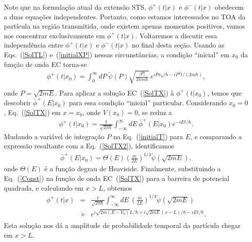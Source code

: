 Note que na formulação atual da extensão STS, $\phi^+(t|x)$ e $\phi^-(t|x)$ obedecem a duas equações independentes. Portanto, como estamos interessados no TOA da partícula na região transmitida, onde existem apenas momentos positivos, vamos nos concentrar exclusivamente em $\phi^+(t|x)$. Voltaremos a discutir essa independência entre $\phi^+(t|x)$ e $\phi^-(t|x)$ no final desta seção. Usando as Eqs.~(\ref{SolTL}) e~(\ref{initialXP}) nessas circunstâncias, a condição ``inicial'' em $x_0$ da função de onda EC torna-se
\begin{eqnarray} \label{initialT}
\phi^+(t|x_0)= 
\int_0^{\infty}dP~{\tilde \psi}(P)\sqrt{\frac{|P|}{2\pi
m\hbar}}~e^{iPx_0/\hbar-iP^2t/(2m\hbar)},\nonumber\\
\end{eqnarray}
onde $P=\sqrt{2mE}$. Para aplicar a solução EC~(\ref{SolTX}) à $\phi^+(t|x_0)$, temos que descobrir ${{\bar \phi}^+}(E|x_0)$ para essa condição ``inicial'' particular. Considerando $x_0=0$, Eq.~(\ref{SolTX}) em $x=x_0$, onde $V(x_0)=0$, se reduz a
\begin{eqnarray}\label{SolTX2}
\phi^+(t|x_0)=\frac{1}{\sqrt{2\pi \hbar}}
\int_{-\infty}^{\infty}dE~{\bar \phi}^+(E|x_0)e^{-iEt/{\hbar}}.
\end{eqnarray}
Mudando a variável de integração $P$ na Eq.~(\ref{initialT}) para $E$, e comparando a expressão resultante com a Eq.~(\ref{SolTX2}), identificamos
\begin{eqnarray}\label{Const}
{\bar \phi}^+(E|x_0)=\Theta(E)\left(\frac{m}{2E}\right)^{1/4} {\tilde \psi}(\sqrt{2mE}),
\end{eqnarray}
onde $\Theta(E)$ é a função degrau de Heaviside. Finalmente, substituindo a Eq.~(\ref{Const}) na função de onda EC~(\ref{SolTX}) para a barreira de potencial quadrada, e calculando em $x>L$, obtemos
\begin{eqnarray}\label{SolTBarrier}
\phi^+(t|x)&=&\frac{1}{\sqrt{2\pi \hbar}}
\int_{-\infty}^{\infty}dE  ~\left(\frac{m}{2E}\right)^{1/4} {\tilde \psi}(\sqrt{2mE})\nonumber\\ &\times& e^{i\sqrt{ 2m \left( E - V_0 \right)} L/\hbar + i\sqrt{ 2m E} (x-L)/\hbar -iEt/\hbar}.\nonumber\\
\end{eqnarray}
Esta solução nos dá a amplitude de probabilidade temporal da partícula chegar em $x > L$.



